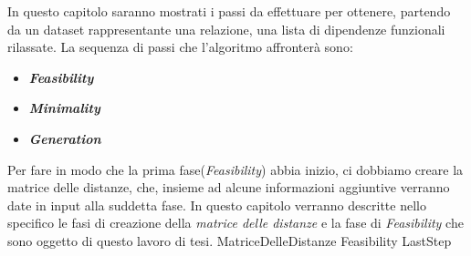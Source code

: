 In questo capitolo saranno mostrati i passi da effettuare per ottenere, partendo da un dataset rappresentante una relazione, una lista di dipendenze funzionali rilassate.
La sequenza di passi che l'algoritmo affronterà sono:
\begin{itemize}
	\item \textbf{\emph{Feasibility}}
	\item \textbf{\emph{Minimality}}
	\item \textbf{\emph{Generation}}
\end{itemize}
Per fare in modo che la prima fase(\emph{Feasibility}) abbia inizio, ci dobbiamo creare la matrice delle distanze, che, insieme ad alcune informazioni aggiuntive verranno date in input alla suddetta fase.
In questo capitolo verranno descritte nello specifico le fasi di creazione della \emph{matrice delle distanze} e la fase di \emph{Feasibility} che sono oggetto di questo lavoro di tesi.
{MatriceDelleDistanze}
{Feasibility}
{LastStep}